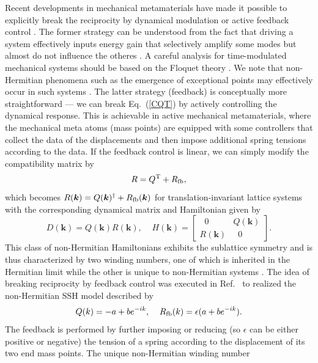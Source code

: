 \documentclass{tADP2e}
\theoremstyle{plain}
\theoremstyle{plain}
\theoremstyle{definition}
\begin{document}
Recent developments in %
mechanical metamaterials have made it possible to explicitly break the reciprocity  
by dynamical modulation \cite{WY18,TG19} or active feedback control \cite{BM19,GA19}. The former strategy can be understood from the fact that driving a system effectively inputs energy gain that selectively amplify some modes but almost do not influence the otheres \cite{SDL17}. A careful analysis for time-modulated mechanical systems should be based on the Floquet theory \cite{FC01}. 
We note that non-Hermitian phenomena such as the emergence of exceptional points may effectively occur in such systems \cite{TG19}. 
The latter strategy (feedback) is conceptually more straightforward --- we can break Eq.~(\ref{CQT}) by actively controlling  the dynamical response. This is achievable in active mechanical metamaterials, where the mechanical meta atoms (mass points) are equipped with some controllers that collect the data of the displacements and then impose additional spring tensions according to the data. If the feedback control is linear, we can simply modify the compatibility matrix by
\begin{equation}
R=Q^{\rm T}+R_{\rm fb},
\end{equation}
which becomes $R(\boldsymbol{k})=Q(\boldsymbol{k})^\dag+R_{\rm fb}(\boldsymbol{k})$ for translation-invariant lattice systems with the corresponding dynamical matrix and Hamiltonian given by
\begin{equation}
D(\boldsymbol{k})=Q(\boldsymbol{k})R(\boldsymbol{k}),\;\;\;\;
H(\boldsymbol{k})=\begin{bmatrix} \;\;0\;\; & Q(\boldsymbol{k}) \\ R(\boldsymbol{k}) & \;\;0\;\; \end{bmatrix}.
\end{equation}
This class of non-Hermitian Hamiltonians exhibits the sublattice symmetry and is thus characterized by two winding numbers, one of which is inherited in the Hermitian limit while the other is unique to non-Hermitian systems \cite{ZG18}. The idea of breaking reciprocity by feedback control was executed in Ref.~\cite{GA19} to realized the non-Hermitian SSH model described by
\begin{equation}
Q(k)=-a+be^{-ik},\;\;\;\;R_{\rm fb}(k)=\epsilon(a+be^{-ik}).
\end{equation}
The feedback is performed by further imposing or reducing (so $\epsilon$ can be either positive or negative) the tension of a spring according to the displacement of its two end mass points. The unique non-Hermitian winding number  
\end{document}
